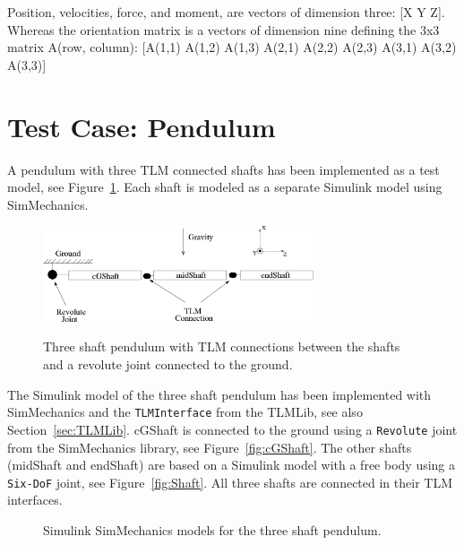 Position, velocities, force, and moment, are vectors of dimension
three: [X Y Z]. Whereas the orientation matrix is a vectors of
dimension nine defining the 3x3 matrix A(row, column): [A(1,1) A(1,2)
A(1,3) A(2,1) A(2,2) A(2,3) A(3,1) A(3,2) A(3,3)]


\section{Test Case: Pendulum}
A pendulum with three TLM connected shafts has been implemented as
a test model, see Figure~\ref{fig:Shafts}. Each shaft is modeled
as a separate Simulink model using SimMechanics.

\begin{figure}[ht]\begin{center}
   {\includegraphics[width=8cm]{figs/Shafts.png}}
    \caption{Three shaft pendulum with TLM connections between the
	shafts and a revolute joint connected to the ground.}
    \label{fig:Shafts}
\end{center}\end{figure}

The Simulink model of the three shaft pendulum has been implemented
with SimMechanics and the {\tt TLMInterface} from the TLMLib, see also
Section~\ref{sec:TLMLib}. cGShaft is connected to the ground using a
{\tt Revolute} joint from the SimMechanics library, see
Figure~\ref{fig:cGShaft}. The other shafts (midShaft and endShaft) are
based on a Simulink model with a free body using a {\tt Six-DoF}
joint, see Figure~\ref{fig:Shaft}. All three shafts are connected
in their TLM interfaces.

\begin{figure}[ht]
\centering
{}
\caption{Simulink SimMechanics models for the three shaft pendulum.}
\label{fig:surfData}
\end{figure}

